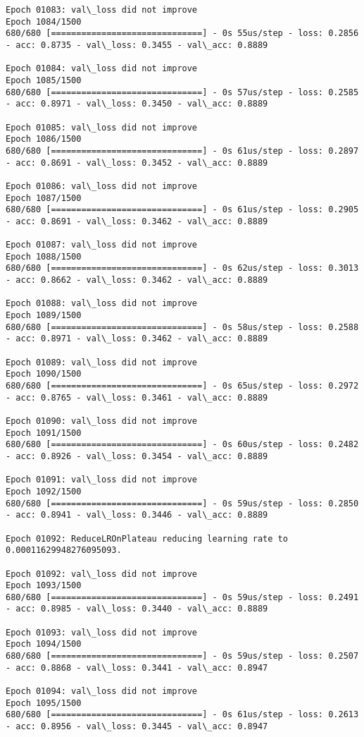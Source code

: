 \documentclass[11pt]{article}
\begin{document}
\begin{Verbatim}[commandchars=\\\{\}]
Epoch 01083: val\_loss did not improve
Epoch 1084/1500
680/680 [==============================] - 0s 55us/step - loss: 0.2856 - acc: 0.8735 - val\_loss: 0.3455 - val\_acc: 0.8889

Epoch 01084: val\_loss did not improve
Epoch 1085/1500
680/680 [==============================] - 0s 57us/step - loss: 0.2585 - acc: 0.8971 - val\_loss: 0.3450 - val\_acc: 0.8889

Epoch 01085: val\_loss did not improve
Epoch 1086/1500
680/680 [==============================] - 0s 61us/step - loss: 0.2897 - acc: 0.8691 - val\_loss: 0.3452 - val\_acc: 0.8889

Epoch 01086: val\_loss did not improve
Epoch 1087/1500
680/680 [==============================] - 0s 61us/step - loss: 0.2905 - acc: 0.8691 - val\_loss: 0.3462 - val\_acc: 0.8889

Epoch 01087: val\_loss did not improve
Epoch 1088/1500
680/680 [==============================] - 0s 62us/step - loss: 0.3013 - acc: 0.8662 - val\_loss: 0.3462 - val\_acc: 0.8889

Epoch 01088: val\_loss did not improve
Epoch 1089/1500
680/680 [==============================] - 0s 58us/step - loss: 0.2588 - acc: 0.8971 - val\_loss: 0.3462 - val\_acc: 0.8889

Epoch 01089: val\_loss did not improve
Epoch 1090/1500
680/680 [==============================] - 0s 65us/step - loss: 0.2972 - acc: 0.8765 - val\_loss: 0.3461 - val\_acc: 0.8889

Epoch 01090: val\_loss did not improve
Epoch 1091/1500
680/680 [==============================] - 0s 60us/step - loss: 0.2482 - acc: 0.8926 - val\_loss: 0.3454 - val\_acc: 0.8889

Epoch 01091: val\_loss did not improve
Epoch 1092/1500
680/680 [==============================] - 0s 59us/step - loss: 0.2850 - acc: 0.8941 - val\_loss: 0.3446 - val\_acc: 0.8889

Epoch 01092: ReduceLROnPlateau reducing learning rate to 0.00011629948276095093.

Epoch 01092: val\_loss did not improve
Epoch 1093/1500
680/680 [==============================] - 0s 59us/step - loss: 0.2491 - acc: 0.8985 - val\_loss: 0.3440 - val\_acc: 0.8889

Epoch 01093: val\_loss did not improve
Epoch 1094/1500
680/680 [==============================] - 0s 59us/step - loss: 0.2507 - acc: 0.8868 - val\_loss: 0.3441 - val\_acc: 0.8947

Epoch 01094: val\_loss did not improve
Epoch 1095/1500
680/680 [==============================] - 0s 61us/step - loss: 0.2613 - acc: 0.8956 - val\_loss: 0.3445 - val\_acc: 0.8947


\end{Verbatim}
\end{document}
